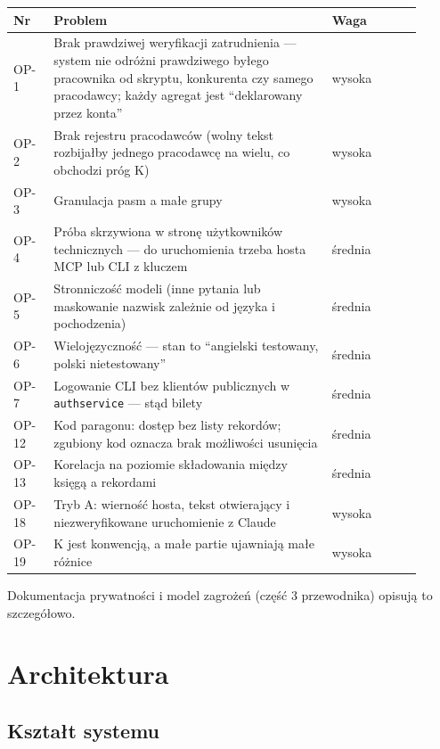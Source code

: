 \begin{longtable}{@{}p{0.09\linewidth}p{0.62\linewidth}p{0.2\linewidth}@{}}
\toprule
Nr & Problem & Waga \\
\midrule
\endhead
OP-1 & Brak prawdziwej weryfikacji zatrudnienia --- system nie odróżni
       prawdziwego byłego pracownika od skryptu, konkurenta czy samego pracodawcy;
       każdy agregat jest ``deklarowany przez konta'' & wysoka \\
OP-2 & Brak rejestru pracodawców (wolny tekst rozbijałby jednego pracodawcę
       na wielu, co obchodzi próg K) & wysoka \\
OP-3 & Granulacja pasm a małe grupy & wysoka \\
OP-4 & Próba skrzywiona w stronę użytkowników technicznych --- do uruchomienia
       trzeba hosta MCP lub CLI z kluczem & średnia \\
OP-5 & Stronniczość modeli (inne pytania lub maskowanie nazwisk zależnie od
       języka i pochodzenia) & średnia \\
OP-6 & Wielojęzyczność --- stan to ``angielski testowany, polski nietestowany'' & średnia \\
OP-7 & Logowanie CLI bez klientów publicznych w \texttt{authservice} --- stąd
       bilety & średnia \\
OP-12 & Kod paragonu: dostęp bez listy rekordów; zgubiony kod oznacza brak
        możliwości usunięcia & średnia \\
OP-13 & Korelacja na poziomie składowania między księgą a rekordami & średnia \\
OP-18 & Tryb A: wierność hosta, tekst otwierający i niezweryfikowane
        uruchomienie z Claude & wysoka \\
OP-19 & K jest konwencją, a małe partie ujawniają małe różnice & wysoka \\
\bottomrule
\end{longtable}

 Dokumentacja prywatności i model zagrożeń
(część 3 przewodnika) opisują to szczegółowo.

\section{Architektura}

\subsection{Kształt systemu}

